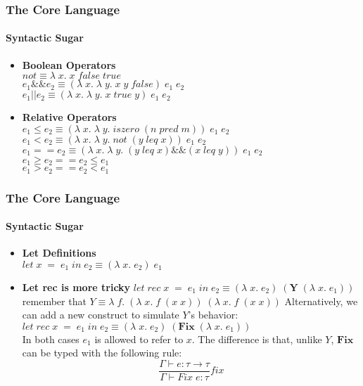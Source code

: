 \documentclass[xcolor=table]{beamer}
\newcommand{\bs}[1]{\boldsymbol{#1}}
\begin{document}
\begin{frame}
\frametitle{The Core Language}
\framesubtitle{Syntactic Sugar}
\begin{block}{}
\begin{itemize}
\item \textbf{Boolean Operators} \\
$not \equiv \lambda \; x. \; x\; false\; true$ \\
$e_1 \&\& e_2 \equiv (\lambda \; x. \; \lambda \; y.\;  x \; y \; false) \; e_1 \; e_2$ \\
$e_1 || e_2 \equiv (\lambda \; x. \; \lambda \; y.\;  x \; true \; y) \; e_1 \; e_2$ \\
\item \textbf{Relative Operators} \\
$e_1 \leq e_2 \equiv (\lambda \; x. \; \lambda \; y.\; iszero \;(n\; pred \; m)) \; e_1 \; e_2$ \\
$e_1 < e_2 \equiv (\lambda \; x. \; \lambda \; y.\; not \;(y\; leq \; x)) \; e_1 \; e_2$ \\
$e_1 == e_2 \equiv (\lambda \; x. \; \lambda \; y.\; (y\; leq \; x) \&\&(x\; leq \; y))\; e_1 \; e_2$ \\
$e_1 \geq e_2 == e_2 \leq e_1 $ \\
$e_1 > e_2 == e_2 < e_1 $ \\
\end{itemize}
\end{block}
\end{frame}

\begin{frame}
\frametitle{The Core Language}
\framesubtitle{Syntactic Sugar}
\begin{block}{}
\begin{itemize}
\item \textbf{Let Definitions} \\
$let \; x \; = \; e_1 \; in \; e_2 \equiv (\lambda \; x. \;e_2 )\; e_1$ \\
\item \textbf{Let rec is more tricky} 
$let\; rec \; x \; = \; e_1 \; in \; e_2 \equiv (\lambda \; x. \;e_2 )\; (\bs{Y} \; (\lambda \; x. \;e_1 ))$ \\
remember that $Y \equiv \lambda \;f. \; (\lambda\; x. \; f \; (x\; x)) \; (\lambda\; x. \; f\;(x\;x))$
Alternatively, we can add a new construct to simulate $Y$'s behavior: 
$let\; rec \; x \; = \; e_1 \; in \; e_2 \equiv (\lambda \; x. \;e_2 )\; (\bs{Fix} \; (\lambda \; x. \;e_1 ))$ \\
In both cases $e_1$ is allowed to refer to $x$. The difference is that, unlike $Y$, $\bs{Fix}$ can be typed with the following rule:
$$ \frac{\Gamma \vdash e:\tau \rightarrow \tau}{\Gamma \vdash Fix \;e:\tau }fix  $$
\end{itemize}
\end{block}
\end{frame}
\end{document}

